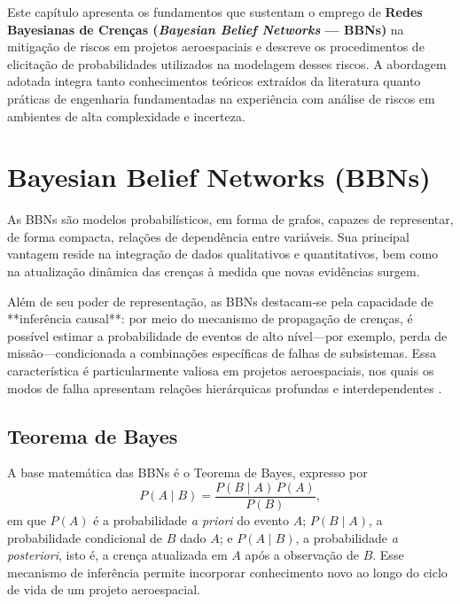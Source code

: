 Este capítulo apresenta os fundamentos que sustentam o emprego de \textbf{Redes Bayesianas de Crenças (\emph{Bayesian Belief Networks} — BBNs)} na mitigação de riscos em projetos aeroespaciais e descreve os procedimentos de elicitação de probabilidades utilizados na modelagem desses riscos. A abordagem adotada integra tanto conhecimentos teóricos extraídos da literatura quanto práticas de engenharia fundamentadas na experiência com análise de riscos em ambientes de alta complexidade e incerteza.






\section{Bayesian Belief Networks (BBNs)}
\label{sec:bbn}
As BBNs são modelos probabilísticos, em forma de grafos, capazes de representar, de forma compacta, relações de dependência entre variáveis. Sua principal vantagem reside na integração de dados qualitativos e quantitativos, bem como na atualização dinâmica das crenças à medida que novas evidências surgem.


Além de seu poder de representação, as BBNs destacam‑se pela capacidade de **inferência causal**: por meio do mecanismo de propagação de crenças, é possível estimar a probabilidade de eventos de alto nível—por exemplo, perda de missão—condicionada a combinações específicas de falhas de subsistemas. Essa característica é particularmente valiosa em projetos aeroespaciais, nos quais os modos de falha apresentam relações hierárquicas profundas e interdependentes \cite{pearl1988probabilistic}.

\subsection{Teorema de Bayes}
\label{subsec:bayes}
A base matemática das BBNs é o Teorema de Bayes, expresso por
\begin{equation}
  P(A\mid B) = \frac{P(B\mid A)\,P(A)}{P(B)},
  \label{eq:bayes}
\end{equation}
em que $P(A)$ é a probabilidade \emph{a priori} do evento $A$; $P(B\mid A)$, a probabilidade condicional de $B$ dado $A$; e $P(A\mid B)$, a probabilidade \emph{a posteriori}, isto é, a crença atualizada em $A$ após a observação de $B$. Esse mecanismo de inferência permite incorporar conhecimento novo ao longo do ciclo de vida de um projeto aeroespacial.


